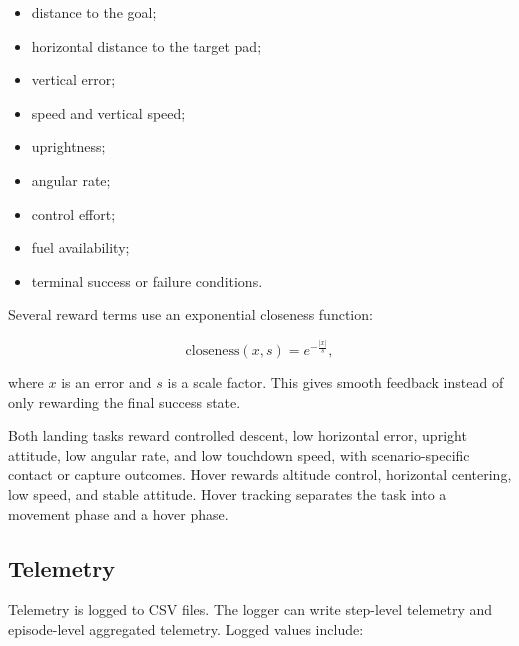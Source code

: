 \documentclass{article}
\begin{document}
\begin{itemize}
    \item distance to the goal;
    \item horizontal distance to the target pad;
    \item vertical error;
    \item speed and vertical speed;
    \item uprightness;
    \item angular rate;
    \item control effort;
    \item fuel availability;
    \item terminal success or failure conditions.
\end{itemize}

Several reward terms use an exponential closeness function:

\begin{equation}
\mathrm{closeness}(x,s) = e^{-\frac{|x|}{s}},
\end{equation}

where \(x\) is an error and \(s\) is a scale factor. This gives smooth feedback instead of only rewarding the final success state.

Both landing tasks reward controlled descent, low horizontal error, upright attitude, low angular rate, and low touchdown speed, with scenario-specific contact or capture outcomes. Hover rewards altitude control, horizontal centering, low speed, and stable attitude. Hover tracking separates the task into a movement phase and a hover phase.

\subsection{Telemetry}

Telemetry is logged to CSV files. The logger can write step-level telemetry and episode-level aggregated telemetry. Logged values include:
\end{document}

